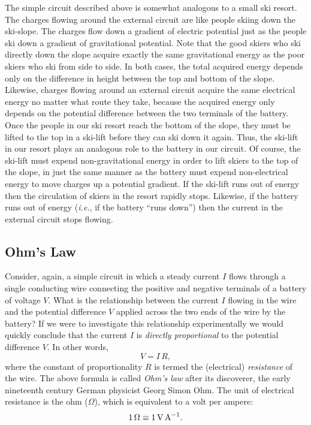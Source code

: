 The simple circuit described above is somewhat analogous to a small ski resort. 
The charges flowing around the external circuit are like people skiing
down the ski-slope. The charges flow down a gradient of electric
potential just as the people ski down a gradient of gravitational potential.
Note that the good skiers who ski directly down the slope acquire exactly the
same gravitational energy as the poor skiers who ski from side to side. 
In both cases, the total acquired energy depends only on the
difference in height between the top and bottom of the slope. Likewise, charges
flowing around  an external  circuit acquire the same electrical energy no matter what route
they take, because the acquired energy only depends on the potential difference
between the two terminals of the battery. Once the people in our ski resort
reach the bottom of the
slope, they must be lifted to the top  in a ski-lift 
before they can ski down it again. Thus, the ski-lift in our  resort plays an analogous
role to the battery in our circuit. Of course, the ski-lift must
expend non-gravitational energy in order to lift skiers to the top of the slope, in just the
same manner as the battery must expend non-electrical energy to move charges up a potential
gradient. If the ski-lift runs out of energy then the circulation of skiers
in the resort rapidly stops. Likewise, if the battery runs out of energy ({\em i.e.},
if the battery ``runs down'') then the current in the external circuit stops flowing. 

\subsection{Ohm's Law}
Consider, again, a simple circuit in which a steady current $I$ flows through
a single conducting wire connecting the positive and negative terminals
of a battery of voltage $V$. What is the relationship between the current
$I$ flowing in the wire and the potential difference $V$ applied across
the two ends of the wire by  the battery? If we were to investigate this relationship experimentally we would quickly conclude that the current
$I$ is {\em directly proportional}\/ to the potential difference  $V$. In other words,
\begin{equation}
V = I\,R,
\end{equation}
where the constant of proportionality $R$ is termed the (electrical) {\em resistance}
of the wire. The above formula is called {\em Ohm's law}\/ after its
discoverer, the early nineteenth century German physicist Georg Simon Ohm. 
The unit of electrical resistance is the ohm ($\Omega$), which is
equivalent to a volt per ampere:
\begin{equation}
1\,\Omega \equiv 1\,{\rm V\,A}^{-1}.
\end{equation}


